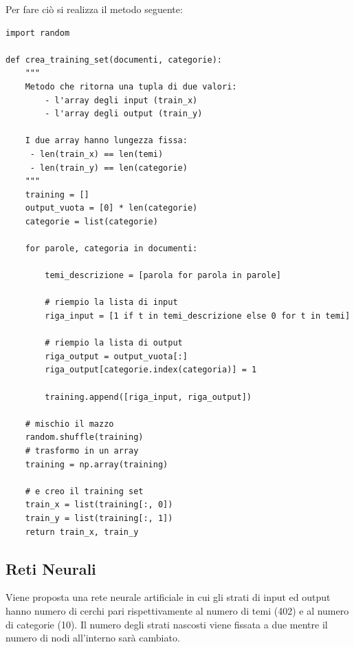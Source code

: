 \documentclass[10pt,a4paper]{report}
\begin{document}
Per fare ciò si realizza il metodo seguente:
\begin{verbatim}
import random

def crea_training_set(documenti, categorie):
    """
    Metodo che ritorna una tupla di due valori:
        - l'array degli input (train_x)
        - l'array degli output (train_y)
        
    I due array hanno lungezza fissa:
     - len(train_x) == len(temi)
     - len(train_y) == len(categorie) 
    """
    training = []
    output_vuota = [0] * len(categorie)
    categorie = list(categorie)

    for parole, categoria in documenti:
        
        temi_descrizione = [parola for parola in parole]
        
        # riempio la lista di input
        riga_input = [1 if t in temi_descrizione else 0 for t in temi]

        # riempio la lista di output
        riga_output = output_vuota[:]
        riga_output[categorie.index(categoria)] = 1

        training.append([riga_input, riga_output])

    # mischio il mazzo
    random.shuffle(training)
    # trasformo in un array
    training = np.array(training)

    # e creo il training set
    train_x = list(training[:, 0])
    train_y = list(training[:, 1])
    return train_x, train_y
\end{verbatim}

\subsection*{Reti Neurali}
Viene proposta una rete neurale artificiale in cui gli strati di input ed output hanno numero di cerchi pari rispettivamente al numero di temi (402) e al numero di categorie (10). Il numero degli strati nascosti viene fissata a due mentre il numero di nodi all'interno sarà cambiato.
\end{document}
